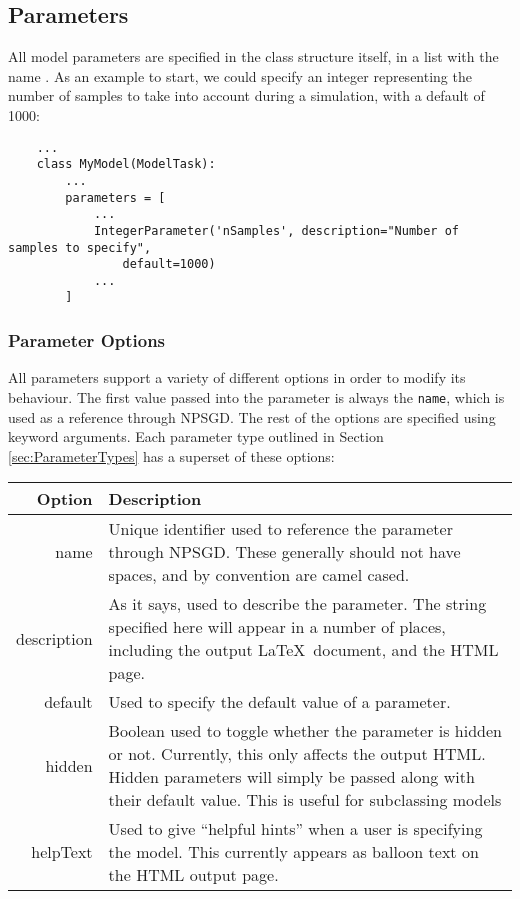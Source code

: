 \documentclass{article}
\begin{document}
\subsection{Parameters}
All model parameters are specified in
the class structure itself, in a list with the name . As an
example to start, we could specify an integer representing the number of samples
to take into account during a simulation, with a default of 1000:
\begin{lstlisting}
    ...
    class MyModel(ModelTask):
        ...
        parameters = [
            ...
            IntegerParameter('nSamples', description="Number of samples to specify",
                default=1000)
            ...
        ]

\end{lstlisting}

\subsubsection{Parameter Options}
All parameters support a variety of different options in order to modify its
behaviour. The first value passed into the parameter is always the
\texttt{name}, which is used as a reference through NPSGD. The rest of the
options are specified using keyword arguments. Each parameter type outlined in
Section \ref{sec:ParameterTypes} has a superset of these options:\\
\begin{tabular}{ r p{4in} }
    \textbf{Option} & \textbf{Description} \\
    \hline
    name & Unique identifier used to reference the parameter through NPSGD.
           These generally should not have spaces, and by convention are camel
           cased. \\
    description & As it says, used to describe the parameter. The string
                  specified here will appear in a number of places, including
                  the output \LaTeX\ document, and the HTML page. \\
    default & Used to specify the default value of a parameter. \\
    hidden  & Boolean used to toggle whether the parameter is hidden or not.
              Currently, this only affects the output HTML. Hidden parameters will simply
              be passed along with their default value. This is useful for
              subclassing models\\
    helpText & Used to give ``helpful hints'' when a user is specifying the
               model. This currently appears as balloon text on the HTML output
               page.
\end{tabular}
\end{document}

